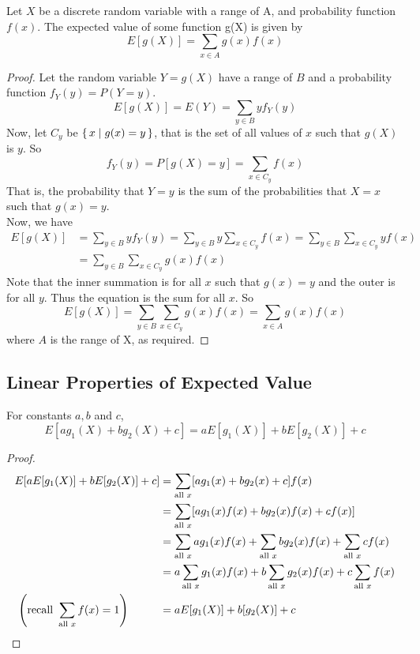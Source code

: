 \begin{theorem}
Let $X$ be a discrete random variable with a range of A, and probability function $f(x)$. The expected value of some function g(X) is given by
\[
    E\left[g(X)\right] = \sum_{x \in A} g(x)f(x)
\]
\end{theorem}
\begin{proof}
Let the random variable $Y = g(X)$ have a range of $B$ and a probability function $f_{\scriptscriptstyle Y}(y) = P(Y = y)$.
\[
    E[g(X)] = E(Y) = \sum_{y \in B} yf_{\scriptscriptstyle Y}(y)
\]
Now, let $C_y$ be $\{\, x \mid g(x) = y \,\}$, that is the set of all values of $x$ such that $g(X)$ is $y$. So
\[
    f_{\scriptscriptstyle Y}(y) = P[g(X) = y]=\sum_{x \in C_y} f(x)
\]
That is, the probability that $Y = y$ is the sum of the probabilities that $X = x$ such that $g(x) = y$. \\
Now, we have
\begin{align*}
    E[g(X)] &= \sum_{y \in B} yf_{\scriptscriptstyle Y}(y) 
             = \sum_{y \in B} y\sum_{x \in C_y}  f(x) 
             = \sum_{y \in B}  \sum_{x \in C_y} yf(x) \\
            &= \sum_{y \in B}  \sum_{x \in C_y}  g(x)f(x)&
\end{align*}
Note that the inner summation is for all $x$ such that $g(x) = y$ and the outer is for all $y$. Thus the equation is the sum for all $x$. So
\[
    E[g(X)] = \sum_{y \in B} \sum_{x \in C_y} g(x)f(x) 
            = \sum_{x \in A} g(x)f(x)
\]
where $A$ is the range of X, as required.
\end{proof}

\subsection*{Linear Properties of Expected Value}
\begin{theorem}
For constants $a,b$ and $c$,
\[
    E[ag_1(X) + bg_2(X) + c] = aE[g_1(X)] + bE[g_2(X)] + c
\]
\end{theorem}
\begin{proof}
\begin{align*}
    E[aE[g_1(X)] + bE[g_2(X)]+c]
    &= \sum_{\text{all } x} [ag_1(x)+bg_2(x)+c]f(x) \\
    &= \sum_{\text{all } x} [ag_1(x)f(x)+bg_2(x)f(x)+cf(x)] \\
    &= \sum_{\text{all } x}ag_1(x)f(x)+\sum_{\text{all } x}bg_2(x)f(x)+\sum_{\text{all } x}cf(x) \\
    &= a\sum_{\text{all } x}g_1(x)f(x)+b\sum_{\text{all } x}g_2(x)f(x)+c\sum_{\text{all } x}f(x) \\
    \left(\text{recall }\sum_{\text{all } x}f(x) = 1\right) \hspace{1cm}
    &= aE[g_1(X)] + b[g_2(X)] + c
\end{align*}
\end{proof}

